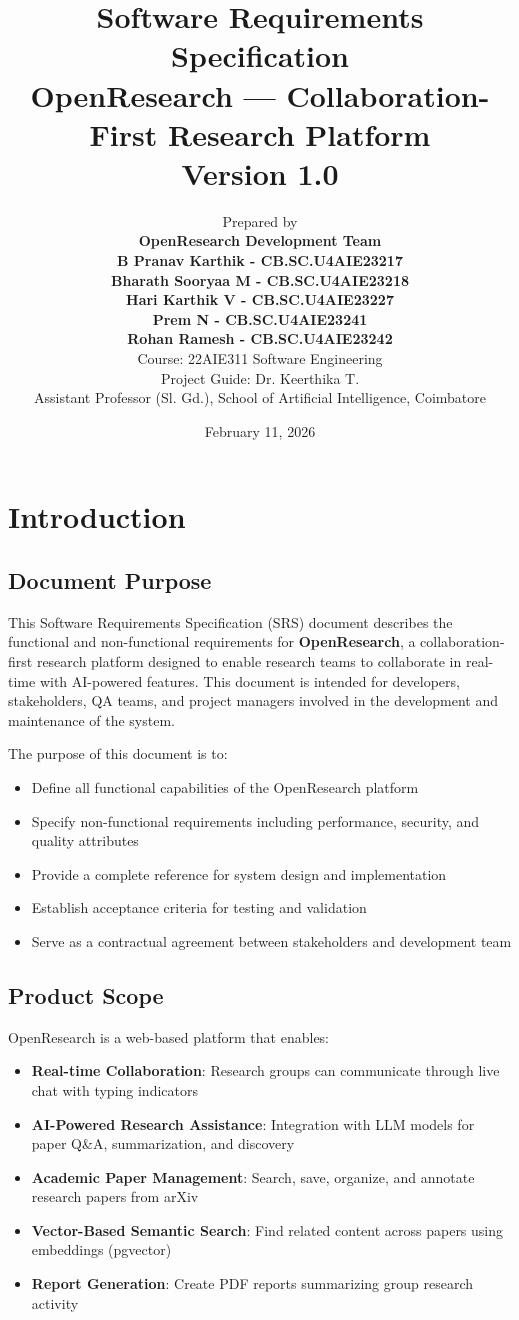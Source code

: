 \documentclass[11pt,a4paper]{article}
\title{\textbf{Software Requirements Specification} \\ 
       \Large OpenResearch --- Collaboration-First Research Platform \\
       \large Version 1.0}
\author{
    Prepared by \\
    \textbf{OpenResearch Development Team} \\
    \vspace{0.3cm}
    \textbf{B Pranav Karthik - CB.SC.U4AIE23217} \\
    \textbf{Bharath Sooryaa M - CB.SC.U4AIE23218} \\
    \textbf{Hari Karthik V - CB.SC.U4AIE23227} \\
    \textbf{Prem N - CB.SC.U4AIE23241} \\
    \textbf{Rohan Ramesh - CB.SC.U4AIE23242} \\
    \vspace{0.5cm}
    Course: 22AIE311 Software Engineering \\
    Project Guide: Dr. Keerthika T. \\
    Assistant Professor (Sl. Gd.), School of Artificial Intelligence, Coimbatore
}
\date{February 11, 2026}
\begin{document}
\maketitle
\thispagestyle{empty}

\newpage
\tableofcontents
\newpage

\section{Introduction}

\subsection{Document Purpose}

This Software Requirements Specification (SRS) document describes the functional and non-functional requirements for \textbf{OpenResearch}, a collaboration-first research platform designed to enable research teams to collaborate in real-time with AI-powered features. This document is intended for developers, stakeholders, QA teams, and project managers involved in the development and maintenance of the system.

The purpose of this document is to:
\begin{itemize}
    \item Define all functional capabilities of the OpenResearch platform
    \item Specify non-functional requirements including performance, security, and quality attributes
    \item Provide a complete reference for system design and implementation
    \item Establish acceptance criteria for testing and validation
    \item Serve as a contractual agreement between stakeholders and development team
\end{itemize}

\subsection{Product Scope}

OpenResearch is a web-based platform that enables:

\begin{itemize}
    \item \textbf{Real-time Collaboration}: Research groups can communicate through live chat with typing indicators
    \item \textbf{AI-Powered Research Assistance}: Integration with LLM models for paper Q\&A, summarization, and discovery
    \item \textbf{Academic Paper Management}: Search, save, organize, and annotate research papers from arXiv
    \item \textbf{Vector-Based Semantic Search}: Find related content across papers using embeddings (pgvector)
    \item \textbf{Report Generation}: Create PDF reports summarizing group research activity
\end{itemize}
\end{document}
